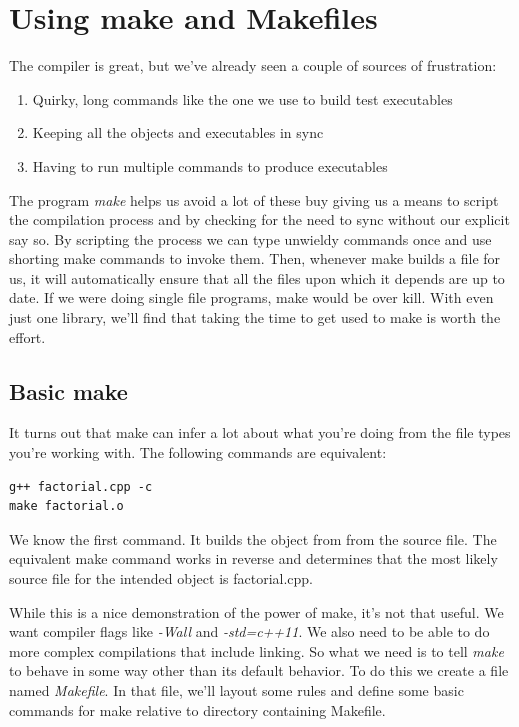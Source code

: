 \documentclass[]{tufte-handout}
\begin{document}
\section{Using make and Makefiles}

The compiler is great, but we've already seen a couple of sources of frustration:
\begin{enumerate}
\item Quirky, long commands like the one we use to build test executables
\item Keeping all the objects and executables in sync
\item Having to run multiple commands to produce executables 
\end{enumerate}
The program \textit{make} helps us avoid a lot of these buy giving us a means to script the compilation process and by checking for the need to sync without our explicit say so. By scripting the process we can type unwieldy commands once and use shorting make commands to invoke them.  Then, whenever make builds a file for us, it will automatically ensure that all the files upon which it depends are up to date. If we were doing single file programs, make would be over kill. With even just one library, we'll find that taking the time to get used to make is worth the effort.

\subsection{Basic make}

It turns out that make can infer a lot about what you're doing from the file types you're working with.  The following commands are equivalent:
\begin{verbatim}
g++ factorial.cpp -c
make factorial.o
\end{verbatim}
We know the first command. It builds the object from from the source file. The equivalent make command works in reverse and determines that the most likely source file for the intended object is factorial.cpp. 

While this is a nice demonstration of the power of make, it's not that useful. We want compiler flags like \textit{-Wall} and \textit{-std=c++11}. We also need to be able to do more complex compilations that include linking.  So what we need is to tell \textit{make} to behave in some way other than its default behavior. To do this we create a file named \textit{Makefile}. In that file, we'll layout some rules and define some basic commands for make relative to directory containing Makefile.
\end{document}
